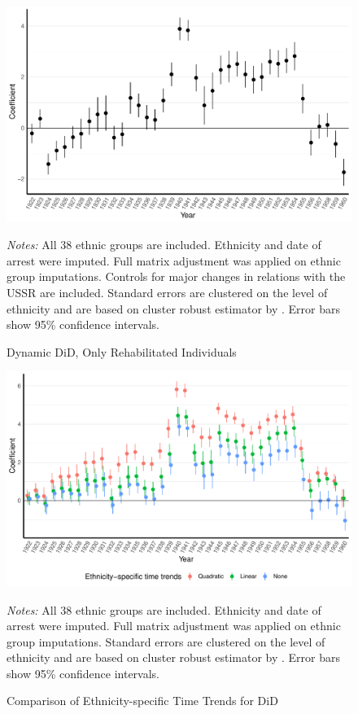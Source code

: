  \begin{figure}[H]
\centering
\caption{Dynamic DiD, Only Rehabilitated Individuals}
\includegraphics[width=\textwidth]{plots/final/fmla_pred_full_imp_date_no_trends_geopol_rehab_cr2.pdf}
\begin{minipage}{0.92\textwidth}
\footnotesize
\emph{Notes:} All 38 ethnic groups are included. Ethnicity and date of arrest were imputed.  Full matrix adjustment was applied on ethnic group imputations. Controls for major changes in relations with the USSR are included.
Standard errors are clustered on the level of ethnicity and are based on cluster robust estimator by \citet{pustejovsky_small-sample_2018}. Error bars show 95\% confidence intervals. 
\end{minipage}
\label{fig:did_effects_rehabs}
\end{figure}

 \begin{figure}[H]
\centering
\caption{Comparison of  Ethnicity-specific Time Trends for DiD}
\includegraphics[width=\textwidth]{plots/effects/robustness_checks/trends_comp_pred_full_imp_date_cr2.pdf}
\begin{minipage}{\textwidth}
\footnotesize
\emph{Notes:} All 38 ethnic groups are included. Ethnicity and date of arrest were imputed.  Full matrix adjustment was applied on ethnic group imputations.  Standard errors are clustered on the level of ethnicity and are based on cluster robust estimator by \citet{pustejovsky_small-sample_2018}. Error bars show 95\% confidence intervals. 
\end{minipage}
\label{fig:did_robustness_time_trends}
\end{figure}


